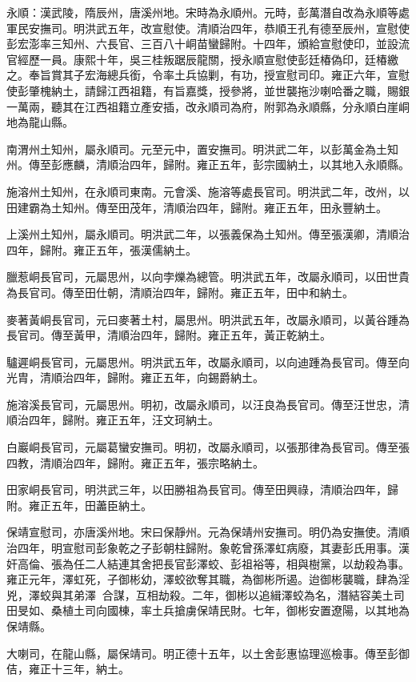\begin{pinyinscope}
永順：漢武陵，隋辰州，唐溪州地。宋時為永順州。元時，彭萬潛自改為永順等處軍民安撫司。明洪武五年，改宣慰使。清順治四年，恭順王孔有德至辰州，宣慰使彭宏澎率三知州、六長官、三百八十峒苗蠻歸附。十四年，頒給宣慰使印，並設流官經歷一員。康熙十年，吳三桂叛踞辰龍關，授永順宣慰使彭廷椿偽印，廷椿繳之。奉旨賞其子宏海總兵銜，令率土兵協剿，有功，授宣慰司印。雍正六年，宣慰使彭肇槐納土，請歸江西祖籍，有旨嘉獎，授參將，並世襲拖沙喇哈番之職，賜銀一萬兩，聽其在江西祖籍立產安插，改永順司為府，附郭為永順縣，分永順白崖峒地為龍山縣。

南渭州土知州，屬永順司。元至元中，置安撫司。明洪武二年，以彭萬金為土知州。傳至彭應麟，清順治四年，歸附。雍正五年，彭宗國納土，以其地入永順縣。

施溶州土知州，在永順司東南。元會溪、施溶等處長官司。明洪武二年，改州，以田建霸為土知州。傳至田茂年，清順治四年，歸附。雍正五年，田永豐納土。

上溪州土知州，屬永順司。明洪武二年，以張義保為土知州。傳至張漢卿，清順治四年，歸附。雍正五年，張漢儒納土。

臘惹峒長官司，元屬思州，以向孛爍為總管。明洪武五年，改屬永順司，以田世貴為長官司。傳至田仕朝，清順治四年，歸附。雍正五年，田中和納土。

麥著黃峒長官司，元曰麥著土村，屬思州。明洪武五年，改屬永順司，以黃谷踵為長官司。傳至黃甲，清順治四年，歸附。雍正五年，黃正乾納土。

驢遲峒長官司，元屬思州。明洪武五年，改屬永順司，以向迪踵為長官司。傳至向光胄，清順治四年，歸附。雍正五年，向錫爵納土。

施溶溪長官司，元屬思州。明初，改屬永順司，以汪良為長官司。傳至汪世忠，清順治四年，歸附。雍正五年，汪文珂納土。

白巖峒長官司，元屬葛蠻安撫司。明初，改屬永順司，以張那律為長官司。傳至張四教，清順治四年，歸附。雍正五年，張宗略納土。

田家峒長官司，明洪武三年，以田勝祖為長官司。傳至田興祿，清順治四年，歸附。雍正五年，田藎臣納土。

保靖宣慰司，亦唐溪州地。宋曰保靜州。元為保靖州安撫司。明仍為安撫使。清順治四年，明宣慰司彭象乾之子彭朝柱歸附。象乾曾孫澤虹病廢，其妻彭氏用事。漢奸高倫、張為任二人結連其舍把長官彭澤蛟、彭祖裕等，相與樹黨，以劫殺為事。雍正元年，澤虹死，子御彬幼，澤蛟欲奪其職，為御彬所遏。迨御彬襲職，肆為淫兇，澤蛟與其弟澤合謀，互相劫殺。二年，御彬以追緝澤蛟為名，潛結容美土司田旻如、桑植土司向國棟，率土兵搶虜保靖民財。七年，御彬安置遼陽，以其地為保靖縣。

大喇司，在龍山縣，屬保靖司。明正德十五年，以土舍彭惠協理巡檢事。傳至彭御佶，雍正十三年，納土。


\end{pinyinscope}
